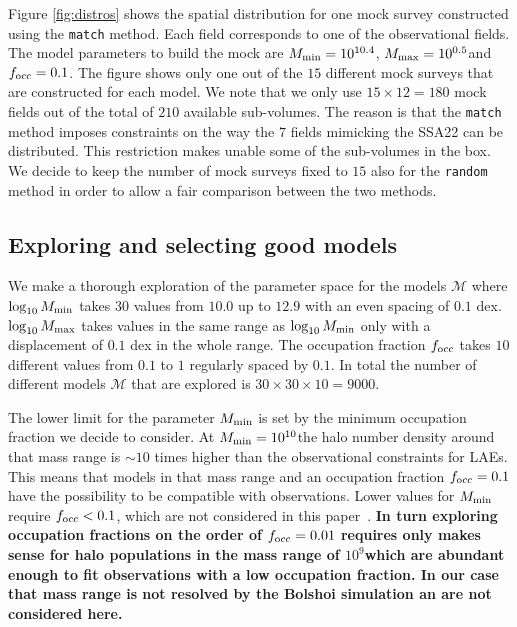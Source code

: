 \documentclass[usenatbib]{mn2e}
\newcommand{\documentname}{paper~}
\newcommand{\hMsun}{{\ifmmode{h^{-1}{\rm
        {M_{\odot}}}}\else{$h^{-1}{\rm{M_{\odot}}}$}\fi}}
\begin{document}
Figure \ref{fig:distros} shows the spatial distribution for one mock
survey constructed using the {\texttt{match}} method. Each field
corresponds to one of the observational fields. The model parameters
to build the mock are $M_{\rm min}=10^{10.4}$\hMsun, $M_{\rm
  max}=10^{0.5}$\hMsun and $f_{\rm occ}=0.1$. The figure shows only
one out of the $15$ different mock surveys that are constructed for
each model. We note that we only use $15\times 12=180$ mock fields out of the
total of $210$ available sub-volumes. The reason is that the {\texttt{match}}
method imposes constraints on the way the $7$ fields mimicking the
SSA22 can be distributed. This restriction makes unable some of the
sub-volumes in the box. We decide to keep the number of mock surveys
fixed to $15$ also for the {\texttt{random}} method in order to allow a
fair comparison between the two methods.

\subsection{Exploring and selecting good models}

We make a thorough exploration of the parameter space for the models
${\mathcal M}$ where $\log_{10} M_{\rm min}$ takes $30$ values from $10.0$ up
to $12.9$ with an even spacing of $0.1$ dex. $\log_{10} M_{\rm max}$
takes values in the same range as $\log_{10}M_{\rm min}$ only with a
displacement of $0.1$ dex in the whole range. The occupation fraction
$f_{\rm occ}$ takes $10$ different values from $0.1$ to $1$ regularly
spaced by $0.1$. In total the number of different models ${\mathcal
  M}$ that are explored is $30 \times 30 \times 10 = 9000$.  

The lower limit for the parameter $M_{\rm min}$ is set by the minimum
occupation fraction we decide to consider. At $M_{\rm
  min}=10^{10}$\hMsun the halo number density around that mass range
is $\sim 10$ times higher than the observational constraints
for LAEs. This means that models in that mass range and an occupation fraction $f_{\rm  occ}=0.1$ have the possibility to be compatible with
observations. Lower values for $M_{\rm min}$ require $f_{\rm
  occ}<0.1$, which are not considered in this \documentname.  {\bf In
  turn exploring occupation fractions on the order of $f_{\rm occ}=0.01$ requires
  only makes sense for halo populations in the mass range of
  $10^{9}$\hMsun which are abundant enough to fit observations with a
  low occupation fraction. In our case that mass range is not resolved
  by the Bolshoi simulation an are not considered here.}
\end{document}
